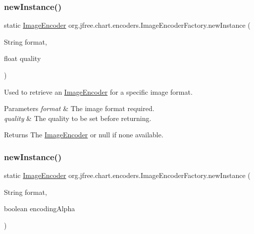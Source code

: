 \subsubsection{\texorpdfstring{new\+Instance()}{newInstance()}\hspace{0.1cm}{\footnotesize\ttfamily [2/4]}}
{\footnotesize\ttfamily static \mbox{\hyperlink{interfaceorg_1_1jfree_1_1chart_1_1encoders_1_1_image_encoder}{Image\+Encoder}} org.\+jfree.\+chart.\+encoders.\+Image\+Encoder\+Factory.\+new\+Instance (\begin{DoxyParamCaption}\item[{String}]{format,  }\item[{float}]{quality }\end{DoxyParamCaption})\hspace{0.3cm}{\ttfamily [static]}}

Used to retrieve an \mbox{\hyperlink{interfaceorg_1_1jfree_1_1chart_1_1encoders_1_1_image_encoder}{Image\+Encoder}} for a specific image format.


\begin{DoxyParams}{Parameters}
{\em format} & The image format required. \\
\hline
{\em quality} & The quality to be set before returning.\\
\hline
\end{DoxyParams}
\begin{DoxyReturn}{Returns}
The \mbox{\hyperlink{interfaceorg_1_1jfree_1_1chart_1_1encoders_1_1_image_encoder}{Image\+Encoder}} or {\ttfamily null} if none available. 
\end{DoxyReturn}
\mbox{\label{classorg_1_1jfree_1_1chart_1_1encoders_1_1_image_encoder_factory_a954e67f1d2ac26668481d9b2de74ade1}} 
\subsubsection{\texorpdfstring{new\+Instance()}{newInstance()}\hspace{0.1cm}{\footnotesize\ttfamily [3/4]}}
{\footnotesize\ttfamily static \mbox{\hyperlink{interfaceorg_1_1jfree_1_1chart_1_1encoders_1_1_image_encoder}{Image\+Encoder}} org.\+jfree.\+chart.\+encoders.\+Image\+Encoder\+Factory.\+new\+Instance (\begin{DoxyParamCaption}\item[{String}]{format,  }\item[{boolean}]{encoding\+Alpha }\end{DoxyParamCaption})\hspace{0.3cm}{\ttfamily [static]}}

